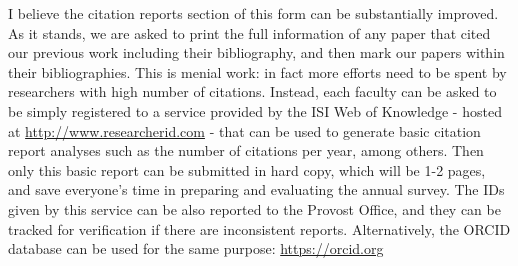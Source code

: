 
I believe the citation reports section of this form can be substantially improved. As it stands, we are asked to print the full information of any paper that cited our previous work including their bibliography, and then mark our papers within their bibliographies. This is menial work: in fact more efforts need to be spent by researchers with high number of citations. Instead, each faculty can be asked to be simply registered to a service provided by the ISI Web of Knowledge - hosted at \url{http://www.researcherid.com} - that can be used to generate basic citation report analyses such as the number of citations per year, among others. Then only this basic report can be submitted in hard copy, which will be 1-2 pages, and save everyone’s time in preparing and evaluating the annual survey. The IDs given by this service can be also reported to the Provost Office, and they can be tracked for verification if there are inconsistent reports. Alternatively, the ORCID database can be used for the same purpose: \url{https://orcid.org}
